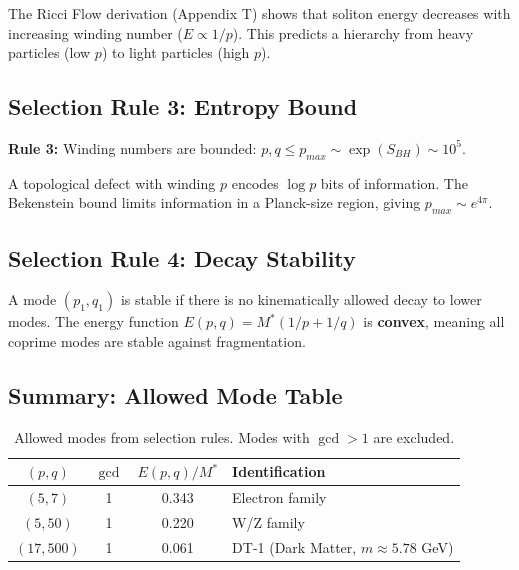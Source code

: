 \documentclass[a4paper,12pt]{article}
\begin{document}
The Ricci Flow derivation (Appendix T) shows that soliton energy decreases with increasing winding number ($E \propto 1/p$). This predicts a hierarchy from heavy particles (low $p$) to light particles (high $p$).

\subsection{Selection Rule 3: Entropy Bound}

\textbf{Rule 3:} Winding numbers are bounded: $p, q \leq p_{max} \sim \exp(S_{BH}) \sim 10^5$.

A topological defect with winding $p$ encodes $\log p$ bits of information. The Bekenstein bound limits information in a Planck-size region, giving $p_{max} \sim e^{4\pi}$.

\subsection{Selection Rule 4: Decay Stability}

A mode $(p_1, q_1)$ is stable if there is no kinematically allowed decay to lower modes. The energy function $E(p,q) = M^*(1/p + 1/q)$ is \textbf{convex}, meaning all coprime modes are stable against fragmentation.

\subsection{Summary: Allowed Mode Table}

\begin{table}[H]
\centering
\begin{tabular}{cccl}
\toprule
$(p,q)$ & $\gcd$ & $E(p,q)/M^*$ & Identification \\
\midrule
$(5,7)$ & 1 & 0.343 & Electron family \\
$(5,50)$ & 1 & 0.220 & W/Z family \\
$(17,500)$ & 1 & 0.061 & DT-1 (Dark Matter, $m \approx 5.78$ GeV) \\
\bottomrule
\end{tabular}
\caption{Allowed modes from selection rules. Modes with $\gcd > 1$ are excluded.}
\end{table}



\end{document}
